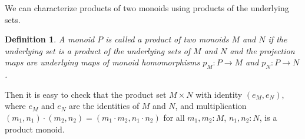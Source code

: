 \documentclass{amsart}
\theoremstyle{plain}
\numberwithin{equation}{section} %
\numberwithin{figure}{section} %
\theoremstyle{plain}
\theoremstyle{plain}
\theoremstyle{plain}
\theoremstyle{plain}
\theoremstyle{plain}
\theoremstyle{plain}
\newtheorem{Def}[thm]{Definition} %
\theoremstyle{remark}
\theoremstyle{remark}
\theoremstyle{remark}
\begin{document}
We can characterize products of two monoids using products of the underlying sets.
\begin{Def}    %
A monoid $P$ is called a product of two monoids $M$ and $N$ if the underlying set is a product of the underlying sets of $M$ and $N$ and the projection maps are underlying maps of monoid homomorphisms $p_M : P \rightarrow M$ and  $p_N : P \rightarrow N$.
\end{Def}
Then it is easy to check that the product set $M \times N$ with identity $(e_M, e_N)$, where $e_M$ and  $e_N$ are the identities of $M$ and $N$, and multiplication $(m_1, n_1) \cdot (m_2, n_2) = (m_1 \cdot m_2, n_1 \cdot n_2)$ for all $m_1, m_2 : M$, $n_1, n_2 : N$, is a product monoid. 
\end{document}
